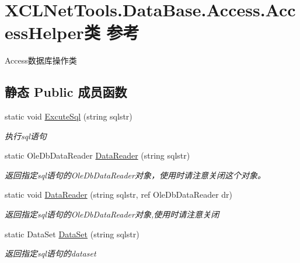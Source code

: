\hypertarget{class_x_c_l_net_tools_1_1_data_base_1_1_access_1_1_access_helper}{}\section{X\+C\+L\+Net\+Tools.\+Data\+Base.\+Access.\+Access\+Helper类 参考}
\label{class_x_c_l_net_tools_1_1_data_base_1_1_access_1_1_access_helper}


Access数据库操作类  


\subsection*{静态 Public 成员函数}
\begin{DoxyCompactItemize}
\item 
static void \hyperlink{class_x_c_l_net_tools_1_1_data_base_1_1_access_1_1_access_helper_acb4489fbc85621f6b27e51328e60ba40}{Excute\+Sql} (string sqlstr)
\begin{DoxyCompactList}\small\item\em 执行sql语句 \end{DoxyCompactList}\item 
static Ole\+Db\+Data\+Reader \hyperlink{class_x_c_l_net_tools_1_1_data_base_1_1_access_1_1_access_helper_ac0a538c45b918a7f8d2f3e2f5a7eab30}{Data\+Reader} (string sqlstr)
\begin{DoxyCompactList}\small\item\em 返回指定sql语句的\+Ole\+Db\+Data\+Reader对象，使用时请注意关闭这个对象。 \end{DoxyCompactList}\item 
static void \hyperlink{class_x_c_l_net_tools_1_1_data_base_1_1_access_1_1_access_helper_a1eb9b1ca36a5bd3ea1a3b28d3196f826}{Data\+Reader} (string sqlstr, ref Ole\+Db\+Data\+Reader dr)
\begin{DoxyCompactList}\small\item\em 返回指定sql语句的\+Ole\+Db\+Data\+Reader对象,使用时请注意关闭 \end{DoxyCompactList}\item 
static Data\+Set \hyperlink{class_x_c_l_net_tools_1_1_data_base_1_1_access_1_1_access_helper_a0dbb31f7f093f7bffa5e3ea1e599941e}{Data\+Set} (string sqlstr)
\begin{DoxyCompactList}\small\item\em 返回指定sql语句的dataset \end{DoxyCompactList}\item 

\end{DoxyCompactItemize}
